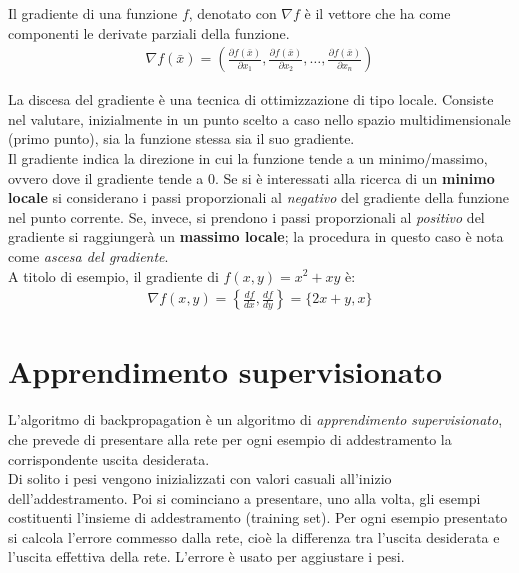 Il gradiente di una funzione $f$, denotato con $\nabla f$ è il vettore che ha come componenti le derivate parziali della funzione.
\begin{align}
    \nabla f(\bar{x}) = \left( \frac{\partial f(\bar{x})}{\partial x_1}, \frac{\partial f(\bar{x})}{\partial x_2}, \dots, \frac{\partial f(\bar{x})}{\partial x_n} \right)
\end{align}

La discesa del gradiente è una tecnica di ottimizzazione di tipo locale. Consiste nel valutare, inizialmente in un punto scelto a caso nello spazio multidimensionale (primo punto), sia la funzione stessa sia il suo gradiente.\\

Il gradiente indica la direzione in cui la funzione tende a un minimo/massimo, ovvero dove il gradiente tende a 0. Se si è interessati alla ricerca di un \textbf{minimo locale} si considerano i passi proporzionali al \emph{negativo} del gradiente della funzione nel punto corrente. Se, invece, si prendono i passi proporzionali al \emph{positivo} del gradiente si raggiungerà un \textbf{massimo locale}; la procedura in questo caso è nota come \emph{ascesa del gradiente}.\\

A titolo di esempio, il gradiente di $f(x, y) = x^2 + xy$ è:
\begin{align*}
    \nabla f(x, y) = \left\{\frac{df}{dx}, \frac{df}{dy} \right\} = \{2x + y, x\}
\end{align*}



\section{Apprendimento supervisionato} %
\label{sec:apprendimento_supervisionato}
L'algoritmo di backpropagation è un algoritmo di \emph{apprendimento supervisionato}, che prevede di presentare alla rete per ogni esempio di addestramento la corrispondente uscita desiderata.\\

Di solito i pesi vengono inizializzati con valori casuali all’inizio dell’addestramento. Poi si cominciano a presentare, uno alla volta, gli esempi costituenti l’insieme di addestramento (training set). Per ogni esempio presentato si calcola l’errore commesso dalla rete, cioè la differenza tra l’uscita desiderata e l’uscita effettiva della rete. L’errore è usato per aggiustare i pesi.\\

